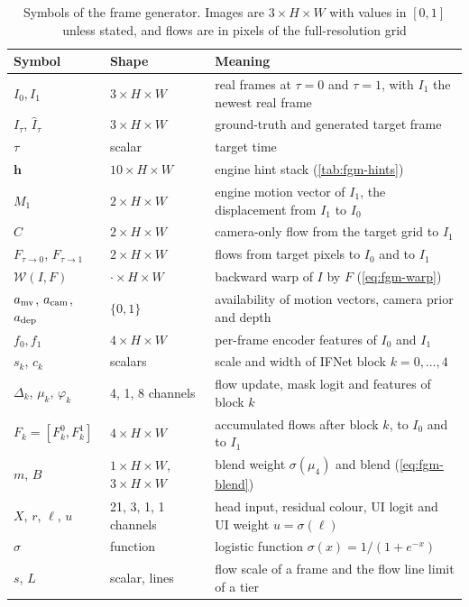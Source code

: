 \begin{table}[!htbp]
\caption{Symbols of the frame generator. Images are $3\times H\times W$ with values in $[0,1]$ unless stated, and flows are in pixels of the full-resolution grid}\label{tab:fgm-notation}
\begin{tabular*}{\textwidth}{@{\extracolsep\fill}llp{}}
\toprule
Symbol & Shape & Meaning \\
\midrule
$I_0,I_1$ & $3\times H\times W$ & real frames at $\tau=0$ and $\tau=1$, with $I_1$ the newest real frame \\
$I_\tau$, $\hat I_\tau$ & $3\times H\times W$ & ground-truth and generated target frame \\
$\tau$ & scalar & target time \\
$\mathbf h$ & $10\times H\times W$ & engine hint stack (\cref{tab:fgm-hints}) \\
$M_1$ & $2\times H\times W$ & engine motion vector of $I_1$, the displacement from $I_1$ to $I_0$ \\
$C$ & $2\times H\times W$ & camera-only flow from the target grid to $I_1$ \\
$F_{\tau\to0}$, $F_{\tau\to1}$ & $2\times H\times W$ & flows from target pixels to $I_0$ and to $I_1$ \\
$\mathcal W(I,F)$ & $\cdot\times H\times W$ & backward warp of $I$ by $F$ (\cref{eq:fgm-warp}) \\
$a_{\rm mv}$, $a_{\rm cam}$, $a_{\rm dep}$ & $\{0,1\}$ & availability of motion vectors, camera prior and depth \\
$f_0,f_1$ & $4\times H\times W$ & per-frame encoder features of $I_0$ and $I_1$ \\
$s_k$, $c_k$ & scalars & scale and width of IFNet block $k=0,\dots,4$ \\
$\Delta_k$, $\mu_k$, $\varphi_k$ & 4, 1, 8 channels & flow update, mask logit and features of block $k$ \\
$F_k=[F_k^0,F_k^1]$ & $4\times H\times W$ & accumulated flows after block $k$, to $I_0$ and to $I_1$ \\
$m$, $B$ & $1\times H\times W$, $3\times H\times W$ & blend weight $\sigma(\mu_4)$ and blend (\cref{eq:fgm-blend}) \\
$X$, $r$, $\ell$, $u$ & 21, 3, 1, 1 channels & head input, residual colour, UI logit and UI weight $u=\sigma(\ell)$ \\
$\sigma$ & function & logistic function $\sigma(x)=1/(1+e^{-x})$ \\
$s$, $L$ & scalar, lines & flow scale of a frame and the flow line limit of a tier \\
\bottomrule
\end{tabular*}
\end{table}

